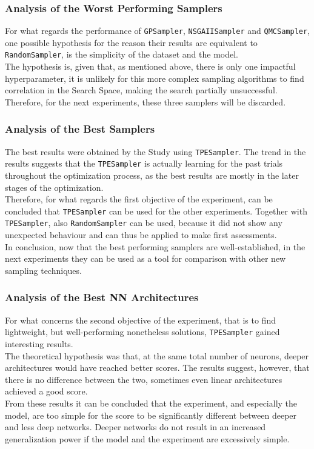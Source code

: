 \subsubsection{Analysis of the Worst Performing Samplers}

For what regards the performance of \texttt{GPSampler}, \texttt{NSGAIISampler} and \texttt{QMCSampler}, one possible hypothesis for the reason their results are equivalent to \texttt{RandomSampler}, is the simplicity of the dataset and the model.
\\[0.3cm]The hypothesis is, given that, as mentioned above, there is only one impactful hyperparameter, it is unlikely for this more complex sampling algorithms to find correlation in the Search Space, making the search partially unsuccessful.
Therefore, for the next experiments, these three samplers will be discarded.

\subsubsection{Analysis of the Best Samplers}

The best results were obtained by the Study using \texttt{TPESampler}. The trend in the results suggests that the \texttt{TPESampler} is actually learning for the past trials throughout the optimization process, as the best results are mostly in the later stages of the optimization.
\\[0.3cm]Therefore, for what regards the first objective of the experiment, can be concluded that \texttt{TPESampler} can be used for the other experiments. Together with \texttt{TPESampler}, also \texttt{RandomSampler} can be used, because it did not show any unexpected behaviour and can thus be applied to make first assessments.
\\[0.3cm]In conclusion, now that the best performing samplers are well-established, in the next experiments they can be used as a tool for comparison with other new sampling techniques. 

\subsubsection{Analysis of the Best NN Architectures}

For what concerns the second objective of the experiment, that is to find lightweight, but well-performing nonetheless solutions, \texttt{TPESampler} gained interesting results.
\\[0.3cm]The theoretical hypothesis was that, at the same total number of neurons, deeper architectures would have reached better scores. The results suggest, however, that there is no difference between the two, sometimes even linear architectures achieved a good score.
\\[0.3cm]From these results it can be concluded that the experiment, and especially the model, are too simple for the score to be significantly different between deeper and less deep networks. Deeper networks do not result in an increased generalization power if the model and the experiment are excessively simple.

